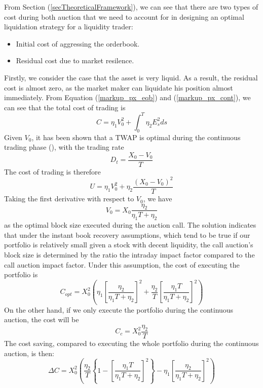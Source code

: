 \documentclass{article}
\begin{document}
From Section (\ref{secTheoreticalFramework}), we can see that there are two types of cost during both auction that we need to account for in designing an optimal liquidation strategy for a liquidity trader:
\begin{itemize}
  \item Initial cost of aggressing the orderbook.
  \item Residual cost due to market resilence.
\end{itemize}

Firstly, we consider the case that the asset is very liquid. As a result, the residual cost is almost zero, as the market maker can liquidate his position almost immediately. From Equation (\ref{markup_px_eqb}) and (\ref{markup_px_cont}), we can see that the total cost of trading is
\[
  C =\eta_1  V_0^2 + \int_0^T \eta_2 E_s^2 ds
\]
Given $V_0$, it has been shown that a TWAP is optimal during the continuous trading phase (\cite{AlmgrenChriss2000}), with the trading rate
\[
  D_t = \frac{X_0 - V_0}{T}
\]
The cost of trading is therefore
\[
  U = \eta_1 V_0^2 + \eta_2 \frac{(X_0 - V_0)^2}{T}
\]
Taking the first derivative with respect to $V_0$, we have
\[
  V_0= X_0 \frac{\eta_2}{\eta_1 T +\eta_2}
\]
as the optimal block size executed during the auction call. The solution indicates that under the instant book recovery assumptions, which tend to be true if our portfolio is relatively small given a stock with decent liquidity, the call auction's block size is determined by the ratio the intraday impact factor compared to the call auction impact factor. Under this assumption, the cost of executing the portfolio is
\[
  C_{opt}  = X_0^2\left(\eta_1  \left[\frac{\eta_2}{\eta_1 T + \eta_2}\right]^2 + \frac{\eta_2}{T}  \left[\frac{\eta_1 T}{\eta_1 T + \eta_2}\right]^2 \right)
\]
On the other hand, if we only execute the portfolio during the continuous auction, the cost will be
\[
  C_c =  X_0^2 \frac{\eta_2}{T}
\]
The cost saving, compared to executing the whole portfolio during the continuous auction, is then:
\[
  \Delta C = X_0^2\left(\frac{\eta_2}{T}  \left\{1 - \left[ \frac{\eta_1 T}{\eta_1 T + \eta_2}\right]^2\right\} - \eta_1  \left[\frac{\eta_2}{\eta_1 T + \eta_2}\right]^2\right)
\]
\end{document}
